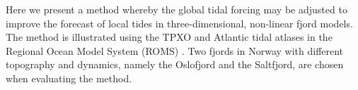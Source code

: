 Here we present a method whereby the global tidal forcing may be adjusted to improve the forecast of local tides in three-dimensional, non-linear fjord models. The method is illustrated using the TPXO and Atlantic tidal atlases \citep{egbert94,egbert02} in the Regional Ocean Model System (ROMS) \citep{shchepetkin05,shchepetkin09,haidvogel08}. Two fjords in Norway with different topography and dynamics, namely the Oslofjord and the Saltfjord, are chosen when evaluating the method.
